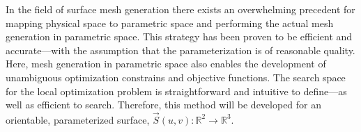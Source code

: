 In the field of surface mesh generation there exists an overwhelming
precedent for mapping physical space to parametric space and performing
the actual mesh generation in parametric space. This strategy has
been proven to be efficient and accurate---with the assumption that the
parameterization is of reasonable quality. Here, mesh generation in
parametric space also enables the development of unambiguous
optimization constrains and objective functions. The search space for
the local optimization problem is straightforward and intuitive to
define---as well as efficient to search. Therefore, this method will be
developed for an orientable, parameterized surface,
$\vec{S}\left(u,v\right) : {\mathbb R}^2 \rightarrow {\mathbb R}^3$.
